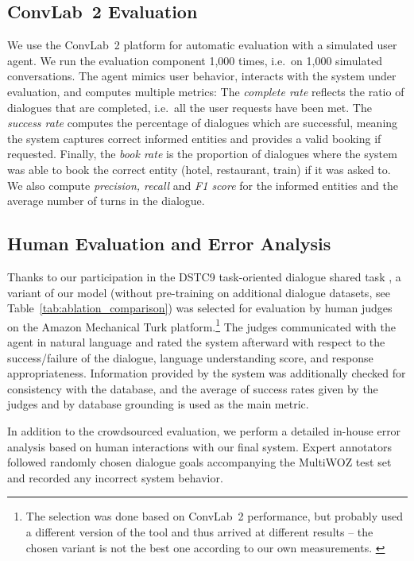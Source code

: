 \documentclass[11pt]{article}
\begin{document}
\subsection{ConvLab~2 Evaluation}
\label{sec:convlab-eval}

We use the ConvLab~2 platform \cite{zhu2020} for automatic evaluation with a simulated user agent.
We run the evaluation component 1,000 times, i.e.\ on 1,000 simulated conversations.
The agent mimics user behavior, interacts with the system under evaluation, and computes multiple metrics: 
The \emph{complete rate} reflects the ratio of dialogues that are completed, i.e.\ all the user requests have been met.
The \emph{success rate} computes the percentage of dialogues which are successful, meaning the system captures correct informed entities and provides a valid booking if requested.
Finally, the \emph{book rate} is the proportion of dialogues where the system was able to book the correct entity (hotel, restaurant, train) if it was asked to.
We also compute \emph{precision, recall} and \emph{F1 score} for the informed entities and the average number of turns in the dialogue.

\subsection{Human Evaluation and Error Analysis}
\label{sec:human-eval}

Thanks to our participation in the DSTC9 task-oriented dialogue shared task \cite{gunasekara2020overview,li_multi-domain_2021}, a variant of our model (without pre-training on additional dialogue datasets, see Table~\ref{tab:ablation_comparison}) was selected for evaluation by human judges on the Amazon Mechanical Turk platform.\footnote{The selection was done based on ConvLab~2 performance, but probably used a different version of the tool and thus arrived at different results -- the chosen variant is not the best one according to our own measurements. \label{fn:dstc-eval}} The judges communicated with the agent in natural language and rated the system afterward with respect to the success/failure of the dialogue, language understanding score, and response appropriateness. Information provided by the system was additionally checked for consistency with the database, and the average of success rates given by the judges and by database grounding is used as the main metric.

In addition to the crowdsourced evaluation, we perform a detailed in-house error analysis based on human interactions with our final system. Expert annotators followed randomly chosen dialogue goals accompanying the MultiWOZ test set and recorded any incorrect system behavior.
\end{document}
